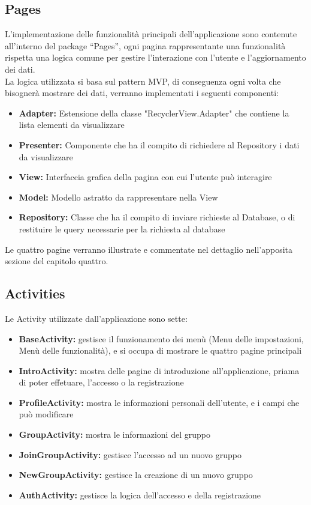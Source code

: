 \subsection{Pages}
L'implementazione delle funzionalità principali dell'applicazione sono contenute all'interno del package ``Pages'', ogni pagina rappresentante una funzionalità rispetta una logica comune per gestire l'interazione con l'utente e l'aggiornamento dei dati.\\
La logica utilizzata si basa sul pattern MVP, di conseguenza ogni volta che bisognerà mostrare dei dati, verranno implementati i seguenti componenti:
\begin{itemize}
    \item  \textbf{Adapter:} Estensione della classe "RecyclerView.Adapter" che contiene la lista elementi da visualizzare
    \item  \textbf{Presenter:} Componente che ha il compito di richiedere al Repository i dati da visualizzare
    \item  \textbf{View:} Interfaccia grafica della pagina con cui l'utente può interagire
    \item  \textbf{Model:} Modello astratto da rappresentare nella View
    \item  \textbf{Repository:} Classe che ha il compito di inviare richieste al Database, o di restituire le query necessarie per la richiesta al database
\end{itemize}
Le quattro pagine verranno illustrate e commentate nel dettaglio nell'apposita sezione del capitolo quattro.

\subsection{Activities}

Le Activity utilizzate dall'applicazione sono sette:
\begin{itemize}
  \item \textbf{BaseActivity:} gestisce il funzionamento dei menù (Menu delle impostazioni, Menù delle funzionalità), e si occupa di mostrare le quattro pagine principali
  \item \textbf{IntroActivity:} mostra delle pagine di introduzione all'applicazione, priama di poter effetuare, l'accesso o la registrazione
  \item \textbf{ProfileActivity:} mostra le informazioni personali dell'utente, e i campi che può modificare
  \item \textbf{GroupActivity:} mostra le informazioni del gruppo
  \item \textbf{JoinGroupActivity:} gestisce l'accesso ad un nuovo gruppo
  \item \textbf{NewGroupActivity:} gestisce la creazione di un nuovo gruppo
  \item \textbf{AuthActivity:} gestisce la logica dell'accesso e della registrazione

\end{itemize}

